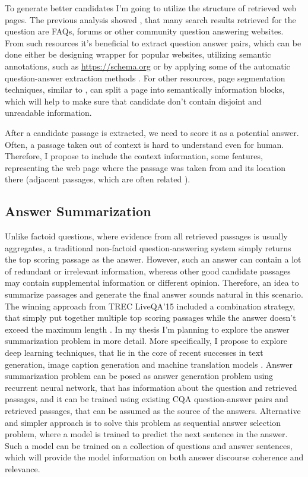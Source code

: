 To generate better candidates I'm going to utilize the structure of retrieved web pages.
The previous analysis showed \cite{savenkov_liveqa15}, that many search results retrieved for the question are FAQs, forums or other community question answering websites.
From such resources it's beneficial to extract question answer pairs, which can be done either be designing wrapper for popular websites, utilizing semantic annotations, such as \hyperref[https://schema.org]{https://schema.org} or by applying some of the automatic question-answer extraction methods \cite{cong2008finding}.
For other resources, page segmentation techniques, similar to \cite{cai2003vips}, can split a page into semantically information blocks, which will help to make sure that candidate don't contain disjoint and unreadable information.

After a candidate passage is extracted, we need to score it as a potential answer.
Often, a passage taken out of context is hard to understand even for human.
Therefore, I propose to include the context information, \ie some features, representing the web page where the passage was taken from and its location there (\eg adjacent passages, which are often related \cite{yang2016beyond}).

\subsection{Answer Summarization}
\label{sec:non-factoid:architecture:summarization}

Unlike factoid questions, where evidence from all retrieved passages is usually aggregates, a traditional non-factoid question-answering system simply returns the top scoring passage as the answer.
However, such an answer can contain a lot of redundant or irrelevant information, whereas other good candidate passages may contain supplemental information or different opinion.
Therefore, an idea to summarize passages and generate the final answer sounds natural in this scenario.
The winning approach from TREC LiveQA'15 included a combination strategy, that simply put together multiple top scoring passages while the answer doesn't exceed the maximum length \cite{diwang_liveqa15}.
In my thesis I'm planning to explore the answer summarization problem in more detail.
More specifically, I propose to explore deep learning techniques, that lie in the core of recent successes in text generation, \eg image caption generation and machine translation models \cite{bahdanau2014neural,xu2015show}.
Answer summarization problem can be posed as answer generation problem using recurrent neural network, that has information about the question and retrieved passages, and it can be trained using existing CQA question-answer pairs and retrieved passages, that can be assumed as the source of the answers.
Alternative and simpler approach is to solve this problem as sequential answer selection problem, where a model is trained to predict the next sentence in the answer.
Such a model can be trained on a collection of questions and answer sentences, which will provide the model information on both answer discourse coherence and relevance.

